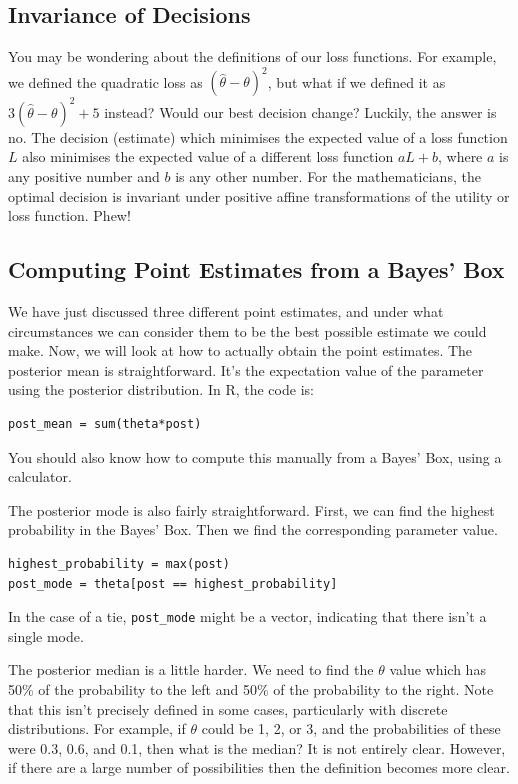\subsection{Invariance of Decisions}
You may be wondering about the definitions of our loss functions. For example,
we defined the quadratic loss as $(\hat{\theta} - \theta)^2$, but what if we
defined it as $3(\hat{\theta} - \theta)^2 + 5$ instead? Would our
best decision change? Luckily, the answer is no. The decision (estimate) which
minimises the expected value of a loss function $L$ also minimises the expected
value of a different loss function $aL + b$, where $a$ is any positive number
and $b$ is any other number.
For the mathematicians, the optimal decision is invariant under positive affine
transformations of the utility or loss function. Phew!

\subsection{Computing Point Estimates from a Bayes' Box}
We have just discussed three different point estimates, and under what
circumstances we can consider them to be the best possible estimate we could
make. Now, we will look at how to actually obtain the point estimates.
The posterior mean is straightforward. It's the expectation value of the parameter
using the posterior distribution. In R, the code is:
\begin{verbatim}
post_mean = sum(theta*post)
\end{verbatim}
You should also know how to compute this manually from a Bayes' Box, using a
calculator.

The posterior mode is also fairly straightforward. First, we can find the
highest probability in the Bayes' Box. Then we find the corresponding parameter
value.
\begin{verbatim}
highest_probability = max(post)
post_mode = theta[post == highest_probability]
\end{verbatim}
In the case of a tie, {\tt post\_mode} might be a vector, indicating
that there isn't a single mode.

The posterior median is a little harder. We need to find the $\theta$ value
which has 50\% of the probability to the left and 50\% of the probability to the
right. Note that this isn't precisely defined in some cases, particularly with
discrete distributions. For example, if $\theta$ could be 1, 2, or 3, and the
probabilities of these were 0.3, 0.6, and 0.1, then what is the median? It is
not entirely clear. However, if there are a large number of possibilities then
the definition becomes more clear.

